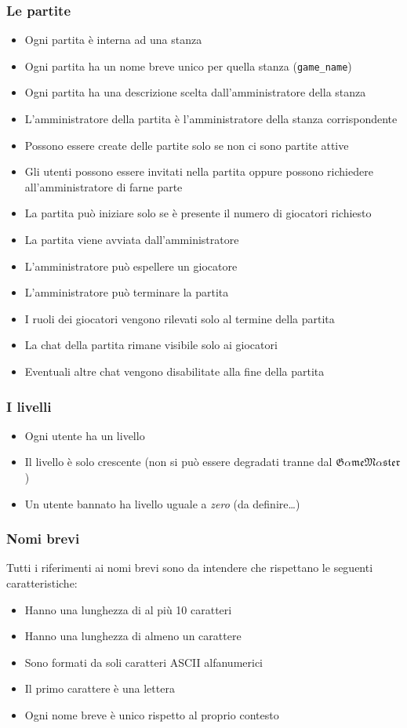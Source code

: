 \documentclass[10pt,a4paper]{article}
\newcommand{\GameMaster}{$\mathfrak{G\alpha me} \allowbreak \mathfrak{M\alpha ster}$}
\begin{document}
\subsubsection{Le partite}
\begin{itemize}
\item Ogni partita è interna ad una stanza
\item Ogni partita ha un nome breve unico per quella stanza (\texttt{game\_name})
\item Ogni partita ha una descrizione scelta dall'amministratore della stanza
\item L'amministratore della partita è l'amministratore della stanza corrispondente
\item Possono essere create delle partite solo se non ci sono partite attive
\item Gli utenti possono essere invitati nella partita oppure possono richiedere all'amministratore di farne parte
\item La partita può iniziare solo se è presente il numero di giocatori richiesto
\item La partita viene avviata dall'amministratore
\item L'amministratore può espellere un giocatore
\item L'amministratore può terminare la partita
\item I ruoli dei giocatori vengono rilevati solo al termine della partita
\item La chat della partita rimane visibile solo ai giocatori
\item Eventuali altre chat vengono disabilitate alla fine della partita
\end{itemize}

\subsubsection{I livelli}
\begin{itemize}
\item Ogni utente ha un livello
\item Il livello è solo crescente (non si può essere degradati tranne dal \GameMaster)
\item Un utente bannato ha livello uguale a \emph{zero} (da definire\dots)
\end{itemize}

\subsubsection{Nomi brevi}
Tutti i riferimenti ai nomi brevi sono da intendere che rispettano le seguenti caratteristiche:
\begin{itemize}
\item Hanno una lunghezza di al più 10 caratteri
\item Hanno una lunghezza di almeno un carattere
\item Sono formati da soli caratteri ASCII alfanumerici
\item Il primo carattere è una lettera
\item Ogni nome breve è unico rispetto al proprio contesto
\end{itemize}
\end{document}
